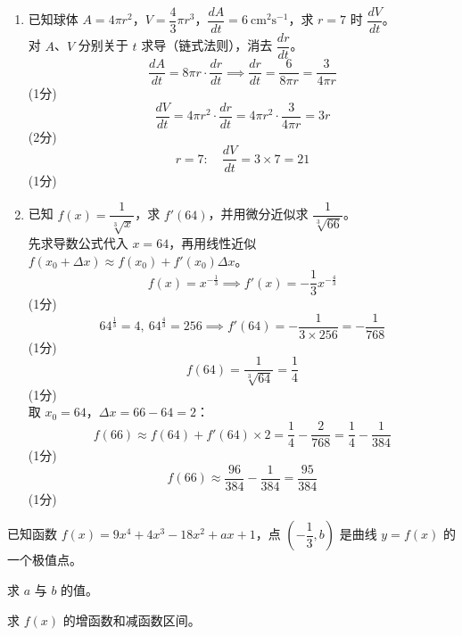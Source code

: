 \documentclass[12pt,a4paper]{exam-zh}
\newcommand{\qscore}[1]{%
    \unskip\nobreak\hfill
    \makebox[0pt][l]{\makebox[4em][r]{(#1\%)}}%
}
\begin{document}
\begin{solution}
    \begin{enumerate}[label=(\alph*)]
        \item 已知球体 $A=4\pi r^2$，$V=\dfrac43\pi r^3$，$\dfrac{dA}{dt}=6\ \text{cm}^2\text{s}^{-1}$，求 $r=7$ 时 $\dfrac{dV}{dt}$。 \\
        对 $A$、$V$ 分别关于 $t$ 求导（链式法则），消去 $\dfrac{dr}{dt}$。
        \[
            \displaystyle \frac{dA}{dt} = 8\pi r\cdot\frac{dr}{dt} \implies \frac{dr}{dt}=\frac{6}{8\pi r}=\frac{3}{4\pi r}
        \] \hfill (1分) \\
        \[
            \displaystyle \frac{dV}{dt} = 4\pi r^2\cdot\frac{dr}{dt} = 4\pi r^2\cdot\frac{3}{4\pi r} = 3r
        \] \hfill (2分) \\
        \[
            \displaystyle r=7:\quad \frac{dV}{dt}=3\times7=21
        \] \hfill (1分)

        \item 已知 $f(x)=\dfrac{1}{\sqrt[3]{x}}$，求 $f'(64)$，并用微分近似求 $\dfrac{1}{\sqrt[3]{66}}$。 \\
        先求导数公式代入 $x=64$，再用线性近似 $f(x_0+\Delta x)\approx f(x_0)+f'(x_0)\Delta x$。
        \[
            \displaystyle f(x)=x^{-\frac13} \implies f'(x)=-\frac13x^{-\frac43}
        \] \hfill (1分) \\
        \[
            \displaystyle 64^{\frac13}=4,\ 64^{\frac43}=256 \implies f'(64)=-\frac{1}{3\times256}=-\frac{1}{768}
        \] \hfill (1分) \\
        \[
            \displaystyle f(64)=\frac{1}{\sqrt[3]{64}}=\frac14
        \] \hfill (1分) \\
        取 $x_0=64$，$\Delta x=66-64=2$：
        \[
            \displaystyle f(66)\approx f(64)+f'(64)\times2 = \frac14-\frac{2}{768}=\frac14-\frac{1}{384}
        \] \hfill (1分) \\
        \[
            \displaystyle f(66)\approx\frac{96}{384}-\frac{1}{384}=\frac{95}{384}
        \] \hfill (1分)
    \end{enumerate}
\end{solution}

\begin{question}[points = 8]
    已知函数 $f(x) = 9x^4 + 4x^3 - 18x^2 + ax + 1$，点 $\left(-\dfrac{1}{3}, b\right)$ 是曲线 $y = f(x)$ 的一个极值点。

    \begin{questionparts}
        \item 求 $a$ 与 $b$ 的值。 \qscore{4}

        \item 求 $f(x)$ 的增函数和减函数区间。 \qscore{4}
    \end{questionparts}
\end{question}
\end{document}
